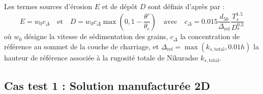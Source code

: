 \documentclass[11pt, a4paper, oneside]{report}
\begin{document}
Les termes sources d'érosion $E$ et de dépôt $D$ sont définis d'après \cite{zhang1993sedimentation, van1984sediment2} par :
\begin{equation}
    E = w_0 c_\Delta \quad \text{et} \quad D = w_0 c_\Delta \max \left(0, 1 - \frac{\theta'}{\theta_c} \right) \quad \text{avec} \quad c_\Delta = 0.015 \frac{d_{50}}{\Delta_\text{ref}} \frac{T_s^{1.5}}{D_*^{0.3}}
\end{equation}
où $w_0$ désigne la vitesse de sédimentation des grains, $c_\Delta$ la concentration de référence au sommet de la couche de charriage, et $\Delta_\text{ref} = \max(k_{s, \text{total}}, 0.01 h)$ la hauteur de référence associée à la rugosité totale de Nikuradse $k_{s, \text{total}}$.

\subsection{Cas test 1 : Solution manufacturée 2D}
\end{document}
